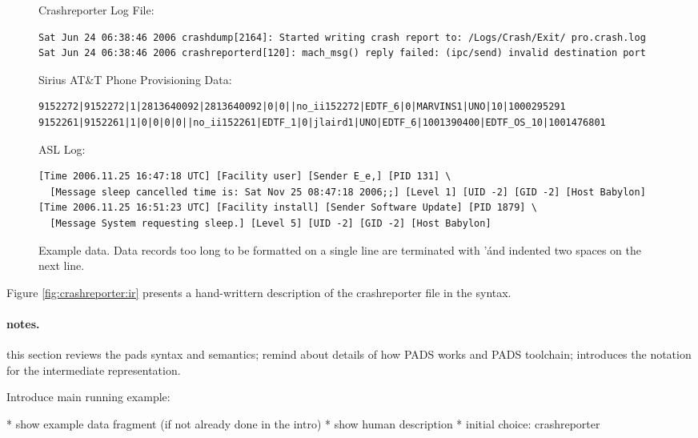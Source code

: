 \begin{figure*}
Crashreporter Log File:
{\small \begin{verbatim}
Sat Jun 24 06:38:46 2006 crashdump[2164]: Started writing crash report to: /Logs/Crash/Exit/ pro.crash.log
Sat Jun 24 06:38:46 2006 crashreporterd[120]: mach_msg() reply failed: (ipc/send) invalid destination port
\end{verbatim}
}

Sirius AT\&T Phone Provisioning Data:
{\small \begin{verbatim}
9152272|9152272|1|2813640092|2813640092|0|0||no_ii152272|EDTF_6|0|MARVINS1|UNO|10|1000295291
9152261|9152261|1|0|0|0|0||no_ii152261|EDTF_1|0|jlaird1|UNO|EDTF_6|1001390400|EDTF_OS_10|1001476801
\end{verbatim}
}

ASL Log:
{\small  \begin{verbatim}
[Time 2006.11.25 16:47:18 UTC] [Facility user] [Sender E_e,] [PID 131] \
  [Message sleep cancelled time is: Sat Nov 25 08:47:18 2006;;] [Level 1] [UID -2] [GID -2] [Host Babylon]
[Time 2006.11.25 16:51:23 UTC] [Facility install] [Sender Software Update] [PID 1879] \
  [Message System requesting sleep.] [Level 5] [UID -2] [GID -2] [Host Babylon]
\end{verbatim}
}


\caption {Example data. 
Data records too long to be formatted on a single line are terminated with '\' and indented two spaces on the next line.}
\label{fig:example data}
\end{figure*}

Figure \ref{fig:crashreporter:ir} presents a hand-writtern description
of the crashreporter file in the \ir{} syntax.



\paragraph {notes.}
this section reviews the pads syntax and semantics; 
remind about details of how PADS works and PADS toolchain;
introduces the
notation for the intermediate representation.


Introduce main running example:  

    * show example data fragment (if not already done in the intro)
    * show human description
    * initial choice: crashreporter




